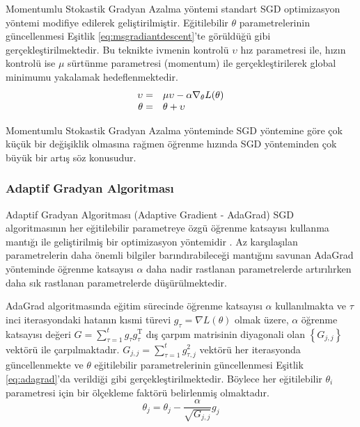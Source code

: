 Momentumlu Stokastik Gradyan Azalma yöntemi standart SGD optimizasyon yöntemi modifiye edilerek geliştirilmiştir. Eğitilebilir $\theta$ parametrelerinin güncellenmesi Eşitlik \ref{eq:msgradiantdescent}'te görüldüğü gibi gerçekleştirilmektedir. Bu teknikte ivmenin kontrolü $\upsilon$ hız parametresi ile, hızın kontrolü ise $\mu$ sürtünme parametresi (momentum) ile gerçekleştirilerek global minimumu yakalamak hedeflenmektedir.
\begin{equation}
	\label{eq:msgradiantdescent}
	\begin{array}{ r l }
		\upsilon = &  \mu\upsilon - \alpha \nabla_{\theta}L(\theta) \\
		\theta = & \theta + \upsilon
	\end{array}
\end{equation}

Momentumlu Stokastik Gradyan Azalma yönteminde SGD yöntemine göre çok küçük bir değişiklik olmasına rağmen öğrenme hızında SGD yönteminden çok büyük bir artış söz konusudur.

\subsubsection{Adaptif Gradyan Algoritması}
Adaptif Gradyan Algoritması (Adaptive Gradient - AdaGrad) SGD algoritmasının her eğitilebilir parametreye özgü öğrenme katsayısı kullanma mantığı ile geliştirilmiş bir optimizasyon yöntemidir \cite{duchi2011adaptive}. Az karşılaşılan parametrelerin daha önemli bilgiler barındırabileceği mantığını savunan AdaGrad yönteminde öğrenme katsayısı $\alpha$ daha nadir rastlanan parametrelerde artırılırken daha sık rastlanan parametrelerde düşürülmektedir. 

AdaGrad algoritmasında eğitim sürecinde öğrenme katsayısı $\alpha$ kullanılmakta ve $\tau$ inci iterasyondaki hatanın kısmi türevi $g_{\tau}=\nabla L(\theta)$ olmak üzere, $\alpha$ öğrenme katsayısı değeri $G=\sum_{\tau=1}^{t} g_{\tau} g_{\tau}^{\mathrm{T}}$ dış çarpım matrisinin diyagonali olan $\left\{G_{j, j}\right\}$ vektörü ile çarpılmaktadır. $G_{j, j}=\sum_{\tau=1}^{t} g_{\tau, j}^{2}$ vektörü her iterasyonda güncellenmekte ve $\theta$ eğitilebilir parametrelerinin güncellenmesi Eşitlik \ref{eq:adagrad}'da verildiği gibi gerçekleştirilmektedir. Böylece her eğitilebilir $\theta_{i}$ parametresi için bir ölçekleme faktörü belirlenmiş olmaktadır. \begin{equation}
	\label{eq:adagrad}
	\theta_{j} = \theta_{j}-\frac{\alpha}{\sqrt{G_{j, j}}} g_{j}
\end{equation}

